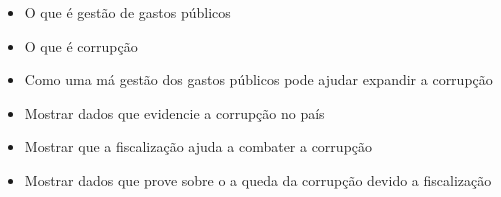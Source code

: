 \begin{itemize}
	\item O que é gestão de gastos públicos
	\item O que é corrupção
	\item Como uma má gestão dos gastos públicos pode ajudar expandir a corrupção
	\item Mostrar dados que evidencie a corrupção no país
	\item Mostrar que a fiscalização ajuda a combater a corrupção
	\item Mostrar dados que prove sobre o a queda da corrupção devido a fiscalização
\end{itemize}

